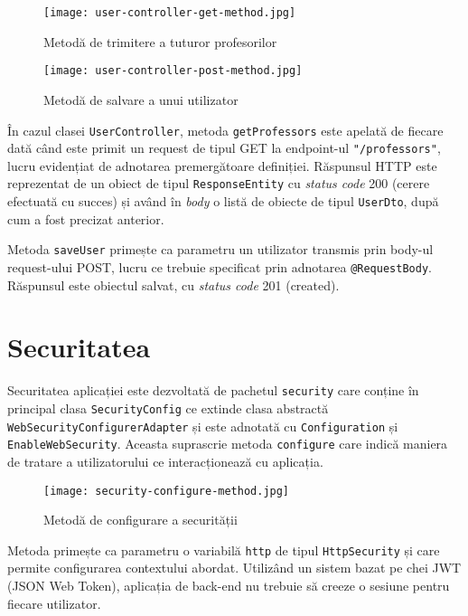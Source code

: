 \begin{figure}[H]
	\centering
	\texttt{[image: user-controller-get-method.jpg]}
	\caption{Metodă de trimitere a tuturor profesorilor}
\end{figure}

\begin{figure}[H]
	\centering
	\texttt{[image: user-controller-post-method.jpg]}
	\caption{Metodă de salvare a unui utilizator}
\end{figure}

În cazul clasei \texttt{UserController}, metoda \texttt{getProfessors} este apelată de fiecare dată când este primit un request de tipul GET la endpoint-ul \texttt{"/professors"}, lucru evidențiat de adnotarea premergătoare definiției. Răspunsul HTTP este reprezentat de un obiect de tipul \texttt{ResponseEntity} cu \textit{status code} 200 (cerere efectuată cu succes) și având în \textit{body} o listă de obiecte de tipul \texttt{UserDto}, după cum a fost precizat anterior.

Metoda \texttt{saveUser} primește ca parametru un utilizator transmis prin body-ul request-ului POST, lucru ce trebuie specificat prin adnotarea \texttt{@RequestBody}. Răspunsul este obiectul salvat, cu \textit{status code} 201 (created).

\section{Securitatea}

Securitatea aplicației este dezvoltată de pachetul \texttt{security} care conține în principal clasa \texttt{SecurityConfig} ce extinde clasa abstractă \texttt{WebSecurityConfigurerAdapter} și este adnotată cu \texttt{Configuration} și \texttt{EnableWebSecurity}. Aceasta suprascrie metoda \texttt{configure} care indică maniera de tratare a utilizatorului ce interacționează cu aplicația.

\begin{figure}[H]
	\centering
	\texttt{[image: security-configure-method.jpg]}
	\caption{Metodă de configurare a securității}
\end{figure}

Metoda primește ca parametru o variabilă \texttt{http} de tipul \texttt{HttpSecurity} și care permite configurarea contextului abordat. Utilizând un sistem bazat pe chei JWT (JSON Web Token), aplicația de back-end nu trebuie să creeze o sesiune pentru fiecare utilizator.

